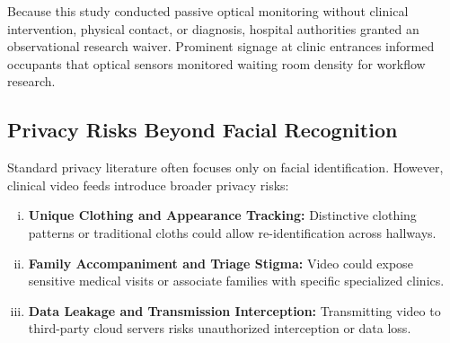 Because this study conducted passive optical monitoring without clinical intervention, physical contact, or diagnosis, hospital authorities granted an observational research waiver. Prominent signage at clinic entrances informed occupants that optical sensors monitored waiting room density for workflow research.

\subsection{Privacy Risks Beyond Facial Recognition}
Standard privacy literature often focuses only on facial identification. However, clinical video feeds introduce broader privacy risks:
\begin{enumerate}[(i)]
    \item \textbf{Unique Clothing and Appearance Tracking:} Distinctive clothing patterns or traditional cloths could allow re-identification across hallways.
    \item \textbf{Family Accompaniment and Triage Stigma:} Video could expose sensitive medical visits or associate families with specific specialized clinics.
    \item \textbf{Data Leakage and Transmission Interception:} Transmitting video to third-party cloud servers risks unauthorized interception or data loss.
\end{enumerate}

